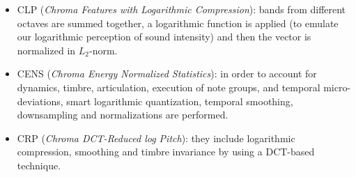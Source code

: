 \begin{itemize}[noitemsep,nolistsep]
	\item CLP (\textit{Chroma Features with Logarithmic Compression}): bands from different octaves are summed together, a logarithmic function is applied (to emulate our logarithmic perception of sound intensity) and then the vector is normalized in $L_2$-norm.
	\item CENS (\textit{Chroma Energy Normalized Statistics}): in order to account for dynamics, timbre, articulation, execution of note groups, and temporal micro-deviations, smart logarithmic quantization, temporal smoothing, downsampling and normalizations are performed.
	\item CRP (\textit{Chroma DCT-Reduced log Pitch}): they include logarithmic compression, smoothing and timbre invariance by using a DCT-based technique.
\end{itemize}